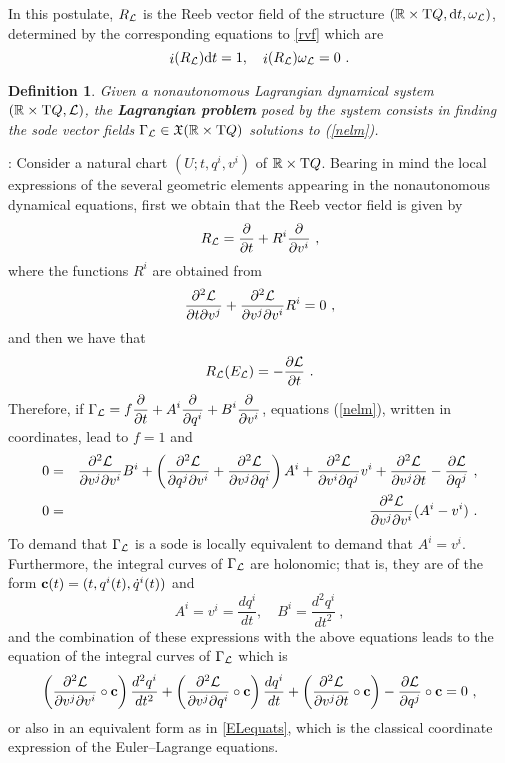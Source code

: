 \documentclass[12pt]{report}
\newtheorem{definition}[teor]{Definition}
\def\beann{\begin{eqnarray*}}
\def\eeann{\end{eqnarray*}}
\def\dst{\displaystyle}
\def\derpar#1#2{\frac{\partial{#1}}{\partial{#2}}}
\def\vf{\mathfrak X}
\def\Lag{{\cal L}}
\def\d{{\rm d}}
\def\Real{\mathbb{R}}
\def\Tan{{\rm T}}
\def\inn{\mathop{i}\nolimits}
\begin{document}
In this postulate, $R_\Lag$ is the Reeb vector field of the structure
$(\Real\times\Tan Q,\d t,\omega_\Lag)$, determined by the corresponding equations to \eqref{rvf} which are
$$
\inn(R_\Lag)\d t=1 ,\quad \inn(R_\Lag)\omega_\Lag=0 \ .
$$

\begin{definition}
Given a nonautonomous Lagrangian dynamical system $(\Real\times\Tan Q,\Lag)$, 
the \textbf{Lagrangian problem} posed by  the system
consists in finding the {\sc sode} vector fields $\Gamma_\Lag \in \vf (\Real\times\Tan Q)$
solutions to (\ref{nelm}).
\end{definition}

:
Consider a natural chart $(U;t,q^i,v^i)$ of $\Real\times\Tan Q$.
Bearing in mind  the local expressions of the several geometric elements
appearing in the nonautonomous dynamical equations,
first we obtain that the Reeb vector field is given by
$$
\displaystyle R_\Lag=\derpar{}{t}+R^i\derpar{}{v^i} \ ,
$$ 
where the functions $R^i$ are obtained from 
$$
\frac{\partial^2\Lag}{\partial t\partial v^j}+\frac{\partial^2\Lag}{\partial v^j\partial v^i}R^i=0 \ ,
$$
and then we have that
$$
R_\Lag(E_\Lag)=-\derpar{\Lag}{t}  \ .
$$
Therefore, if \(\dst \Gamma_\Lag = f\derpar{}{t}+A^i\derpar{}{q^i} +
B^i\derpar{}{v^i}\),
equations (\ref{nelm}), written in coordinates, lead to $f=1$ and
\beann
0&=&\frac{\partial^2\Lag}{\partial v^j \partial v^i}B^i+
\left(\frac{\partial^2\Lag}{\partial q^j \partial v^i}+
\frac{\partial^2\Lag}{\partial v^j \partial q^i}\right)A^i+
\frac{\partial^2\Lag}{\partial v^i \partial q^j}v^i+
\frac{\partial^2\Lag}{\partial v^j \partial t}-
\derpar{\Lag}{q^j} \ ,
\\
0&=&\frac{\partial^2\Lag}{\partial v^j \partial v^i}(A^i-v^i) \ .
\eeann
To demand that $\Gamma_\Lag$ is a {\sc sode} is locally equivalent to demand that
$A^i=v^i$. Furthermore, the integral curves of $\Gamma_\Lag$
are holonomic; that is, they are of the form ${\bf c}(t)=(t,q^i(t),\dot q^i(t))$ and
$$
A^i = v^i = \frac{d q^i}{d t}
,\quad
B^i = \frac{d^2q^i}{d t^2} \ ,
$$
and the combination of these expressions with the above equations leads to the
equation of  the integral curves of $\Gamma_\Lag$ which is
$$
\left(\frac{\partial^2\Lag}{\partial v^j \partial v^i}\circ{\bf c}\right)
\frac{d^2q^i}{d t^2}+
\left(\frac{\partial^2\Lag}{\partial v^j \partial q^i}\circ{\bf c}\right)
\frac{d q^i}{d t}+
\left(\frac{\partial^2\Lag}{\partial v^j \partial t}\circ{\bf c}\right)
-\derpar{\Lag}{q^j}\circ{\bf c}=0 \ ,
$$
or also in an equivalent form as in \eqref{ELequats},
which is the classical coordinate expression of the Euler--Lagrange equations.
\end{document}
